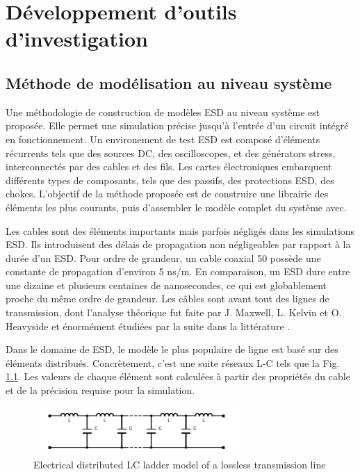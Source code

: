 \chapter{Développement d'outils d'investigation}
\label{chap:2}
\section{Méthode de modélisation au niveau système}

Une méthodologie de construction de modèles ESD au niveau système est proposée.
Elle permet une simulation précise jusqu'à l'entrée d'un circuit intégré en fonctionnement.
Un environement de test ESD est composé d'éléments récurrents tels que des sources DC, des oscilloscopes, et des générators stress, interconnectés par des cables et des fils.
Les cartes électroniques embarquent différents types de composants, tels que des passifs, des protections ESD, des chokes.
L'objectif de la méthode proposée est de construire une librairie des éléments les plus courants, puis d'assembler le modèle complet du système avec.

Les cables sont des éléments importants mais parfois négligés dans les simulations ESD.
Ils introduisent des délais de propagation non négligeables par rapport à la durée d'un ESD.
Pour ordre de grandeur, un cable coaxial 50\textOmega{} possède une constante de propagation d'environ 5 ns/m.
En comparaison, un ESD dure entre une dizaine et plusieurs centaines de nanosecondes, ce qui est globablement proche du même ordre de grandeur.
Les câbles sont avant tout des lignes de transmission, dont l'analyse théorique fut faite par J. Maxwell, L. Kelvin et O. Heavyside et énormément étudiées par la suite dans la littérature \cite{branin-tl-ref, hf-coax,lossy-tl,emc-analysis-tl}.

Dans le domaine de ESD, le modèle le plus populaire de ligne est basé sur des éléments distribués.
Concrètement, c'est une suite réseaux L-C tels que la Fig. \ref{fig:dis-line-model}.
Les valeurs de chaque élément sont calculées à partir des propriétés du cable et de la précision requise pour la simulation.

\begin{figure}[!h]
  \centering
  \includegraphics[width=0.7\textwidth]{src/1/figures/lc_ladder.pdf}
  \caption{Electrical distributed LC ladder model of a lossless transmission line}
  \label{fig:dis-line-model}
\end{figure}

